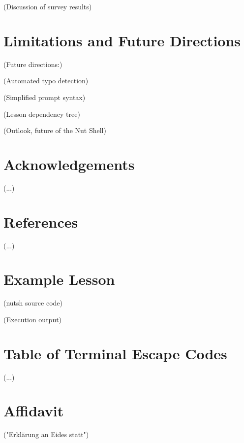 \documentclass[twoside]{scrreprt}
\begin{document}
        (Discussion of survey results)

\chapter{Limitations and Future Directions}

        (Future directions:)

            (Automated typo detection)

            (Simplified prompt syntax)

            (Lesson dependency tree)

        (Outlook, future of the Nut Shell)

\chapter{Acknowledgements}

        (...)

\chapter{References}

        (...)

\appendix

\chapter{Example Lesson}

        (nutsh source code)

        (Execution output)

\chapter{Table of Terminal Escape Codes}

        (...)

\chapter*{Affidavit}

        ("Erklärung an Eides statt")
\end{document}
